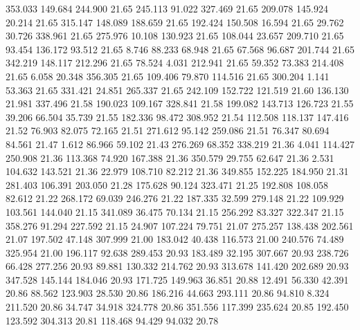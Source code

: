  353.033  149.684  244.900        21.65
 245.113   91.022  327.469        21.65
 209.078  145.924   20.214        21.65
 315.147  148.089  188.659        21.65
 192.424  150.508   16.594        21.65
  29.762   30.726  338.961        21.65
 275.976   10.108  130.923        21.65
 108.044   23.657  209.710        21.65
  93.454  136.172   93.512        21.65
   8.746   88.233   68.948        21.65
  67.568   96.687  201.744        21.65
 342.219  148.117  212.296        21.65
  78.524    4.031  212.941        21.65
  59.352   73.383  214.408        21.65
   6.058   20.348  356.305        21.65
 109.406   79.870  114.516        21.65
 300.204    1.141   53.363        21.65
 331.421   24.851  265.337        21.65
 242.109  152.722  121.519        21.60
 136.130   21.981  337.496        21.58
 190.023  109.167  328.841        21.58
 199.082  143.713  126.723        21.55
  39.206   66.504   35.739        21.55
 182.336   98.472  308.952        21.54
 112.508  118.137  147.416        21.52
  76.903   82.075   72.165        21.51
 271.612   95.142  259.086        21.51
  76.347   80.694   84.561        21.47
   1.612   86.966   59.102        21.43
 276.269   68.352  338.219        21.36
   4.041  114.427  250.908        21.36
 113.368   74.920  167.388        21.36
 350.579   29.755   62.647        21.36
   2.531  104.632  143.521        21.36
  22.979  108.710   82.212        21.36
 349.855  152.225  184.950        21.31
 281.403  106.391  203.050        21.28
 175.628   90.124  323.471        21.25
 192.808  108.058   82.612        21.22
 268.172   69.039  246.276        21.22
 187.335   32.599  279.148        21.22
 109.929  103.561  144.040        21.15
 341.089   36.475   70.134        21.15
 256.292   83.327  322.347        21.15
 358.276   91.294  227.592        21.15
  24.907  107.224   79.751        21.07
 275.257  138.438  202.561        21.07
 197.502   47.148  307.999        21.00
 183.042   40.438  116.573        21.00
 240.576   74.489  325.954        21.00
 196.117   92.638  289.453        20.93
 183.489   32.195  307.667        20.93
 238.726   66.428  277.256        20.93
  89.881  130.332  214.762        20.93
 313.678  141.420  202.689        20.93
 347.528  145.144  184.046        20.93
 171.725  149.963   36.851        20.88
  12.491   56.330   42.391        20.86
  88.562  123.903   28.530        20.86
 186.216   44.663  293.111        20.86
  94.810    8.324  211.520        20.86
  34.747   34.918  324.778        20.86
 351.556  117.399  235.624        20.85
 192.450  123.592  304.313        20.81
 118.468   94.429   94.032        20.78
